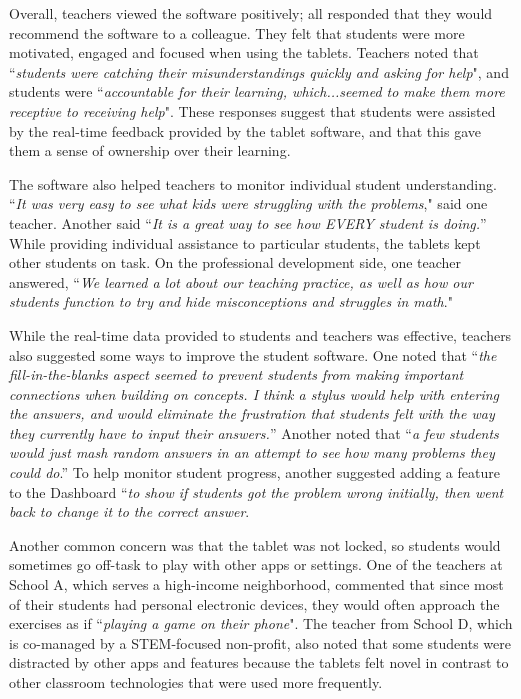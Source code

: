 \documentclass{sigchi}
\begin{document}
Overall, teachers viewed the software positively; all responded that they would recommend the software to a colleague. They felt that students were more motivated, engaged and focused when using the tablets. Teachers noted that ``\emph{students were catching their misunderstandings quickly and asking for help}", and students were ``\emph{accountable for their learning, which...seemed to make them more receptive to receiving help}". These responses suggest that students were assisted by the real-time feedback provided by the tablet software, and that this gave them a sense of ownership over their learning.

The software also helped teachers to monitor individual student understanding. ``\emph{It was very easy to see what kids were struggling with the problems}," said one teacher. Another said ``\emph{It is a great way to see how EVERY student is doing.}''  While providing individual assistance to particular students, the tablets kept other students on task. On the professional development side, one teacher answered, ``\emph{We learned a lot about our teaching practice, as well as how our students function to try and hide misconceptions and struggles in math}."

While the real-time data provided to students and teachers was effective, teachers also suggested some ways to improve the student software. One noted that ``\emph{the fill-in-the-blanks aspect seemed to prevent students from making important connections when building on concepts. I think a stylus would help with entering the answers, and would eliminate the frustration that students felt with the way they currently have to input their answers.}'' Another noted that ``\emph{a few students would just mash random answers in an attempt to see how many problems they could do}.''  To help monitor student progress, another suggested adding a feature to the Dashboard ``\emph{to show if students got the problem wrong initially, then went back to change it to the correct answer}.

Another common concern was that the tablet was not locked, so students would sometimes go off-task to play with other apps or settings. One of the teachers at School A, which serves a high-income neighborhood, commented that since most of their students had personal electronic devices, they would often approach the exercises as if ``\emph{playing a game on their phone}". The teacher from School D, which is co-managed by a STEM-focused non-profit, also noted that some students were distracted by other apps and features because the tablets felt novel in contrast to other classroom technologies that were used more frequently.
\end{document}
